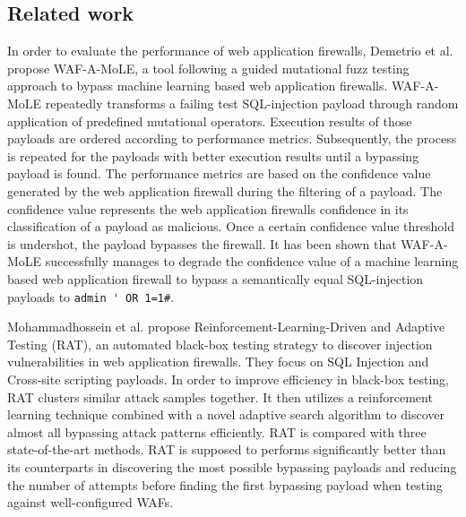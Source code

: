 \subsection{Related work}
In order to evaluate the performance of web application firewalls, Demetrio et al. \cite{rw/demetrio} propose WAF-A-MoLE, a tool following a guided mutational fuzz testing approach to bypass machine learning based web application firewalls. WAF-A-MoLE repeatedly transforms a failing test SQL-injection payload through random application of predefined mutational operators. Execution results of those payloads are ordered according to performance metrics. Subsequently, the process is repeated for the payloads with better execution results until a bypassing payload is found. The performance metrics are based on the confidence value generated by the web application firewall during the filtering of a payload. The confidence value represents the web application firewalls confidence in its classification of a payload as malicious. Once a certain confidence value threshold is undershot, the payload bypasses the firewall. It has been shown that WAF-A-MoLE successfully manages to degrade the confidence value of a machine learning based web application firewall to bypass a semantically equal SQL-injection payloads to \verb|admin ' OR 1=1#|.

Mohammadhossein et al. \cite{rw/mohammad} propose Reinforcement-Learning-Driven and Adaptive Testing (RAT), an automated black-box testing strategy to discover injection vulnerabilities in web application firewalls. They focus on SQL Injection and Cross-site scripting payloads. In order to improve efficiency in black-box testing, RAT clusters similar attack samples together. It then utilizes a reinforcement learning technique combined with a novel adaptive search algorithm to discover almost all bypassing attack patterns efficiently. RAT is compared with three state-of-the-art methods. RAT is supposed to performs significantly better than its counterparts in discovering the most possible bypassing payloads and reducing the number of attempts before finding the first bypassing payload when testing against well-configured WAFs.


